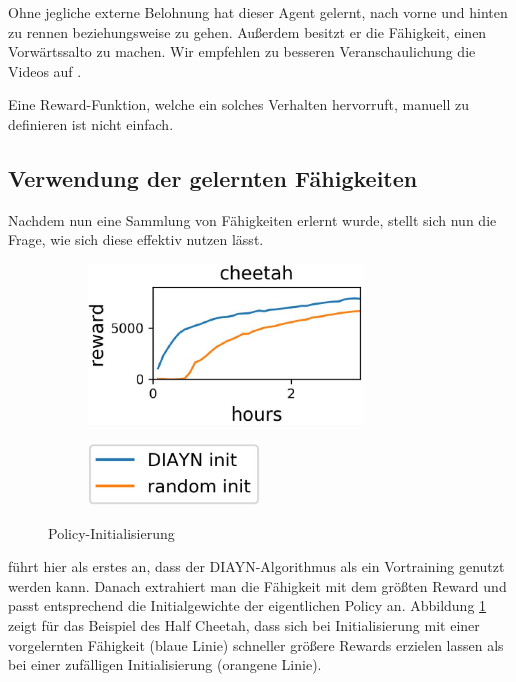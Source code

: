 Ohne jegliche externe Belohnung hat dieser Agent gelernt, nach vorne und hinten zu rennen beziehungsweise zu gehen. Außerdem besitzt er die Fähigkeit, einen Vorwärtssalto zu machen. Wir empfehlen zu besseren Veranschaulichung die Videos auf \cite{diversity_web}.

Eine Reward-Funktion, welche ein solches Verhalten hervorruft, manuell zu definieren ist nicht einfach.

\subsection{Verwendung der gelernten Fähigkeiten}
\label{sec:diversityusage}
Nachdem nun eine Sammlung von Fähigkeiten erlernt wurde, stellt sich nun die Frage, wie sich diese effektiv nutzen lässt.

\smallspace

\begin{figure}[h]
\begin{subfigure}{0.6\textwidth}
\includegraphics[width=0.8\textwidth, keepaspectratio=true, right]{images/cheetah_rewards.JPG}
\end{subfigure}
\begin{subfigure}{0.4\textwidth}
\includegraphics[width=0.5\textwidth, keepaspectratio=true, left]{images/cheetah_rewards_exp.JPG}
\end{subfigure}
\caption{Policy-Initialisierung} \label{img:cheetah_rewards}
\end{figure}

\cite{diversity_eysenbach} führt hier als erstes an, dass der DIAYN-Algorithmus als ein Vortraining genutzt werden kann. Danach extrahiert man die Fähigkeit mit dem größten Reward und passt entsprechend die Initialgewichte der eigentlichen Policy an. Abbildung \ref{img:cheetah_rewards} zeigt für das Beispiel des Half Cheetah, dass sich bei Initialisierung mit einer vorgelernten Fähigkeit (blaue Linie) schneller größere Rewards erzielen lassen als bei einer zufälligen Initialisierung (orangene Linie).

